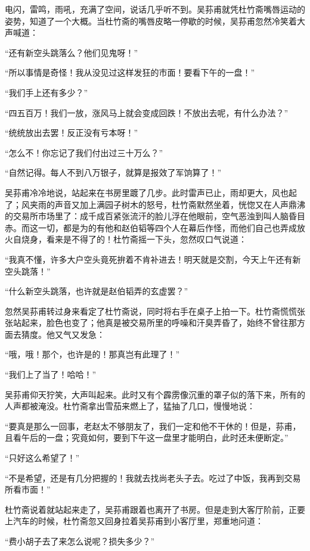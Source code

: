 \par 电闪，雷鸣，雨吼，充满了空间，说话几乎听不到。吴荪甫就凭杜竹斋嘴唇运动的姿势，知道了一个大概。当杜竹斋的嘴唇皮略一停歇的时候，吴荪甫忽然冷笑着大声喊道：
\par “还有新空头跳落么？他们见鬼呀！”
\par “所以事情是奇怪！我从没见过这样发狂的市面！要看下午的一盘！”
\par “我们手上还有多少？”
\par “四五百万！我们一放，涨风马上就会变成回跌！不放出去呢，有什么办法？”
\par “统统放出去罢！反正没有亏本呀！”
\par “怎么不！你忘记了我们付出过三十万么？”
\par “自然记得。每人不到八万银子，就算是报效了军饷算了！”
\par 吴荪甫冷冷地说，站起来在书房里踱了几步。此时雷声已止，雨却更大，风也起了；风夹雨的声音又加上满园子树木的怒号，杜竹斋默然坐着，恍惚又在人声鼎沸的交易所市场里了：成千成百紧张流汗的脸儿浮在他眼前，空气恶浊到叫人脑昏目赤。而这一切，都是为的有他和赵伯韬等四个人在幕后作怪，而他们自己也弄成放火自烧身，看来是不得了的！杜竹斋摇一下头，忽然叹口气说道：
\par “我真不懂，许多大户空头竟死拚着不肯补进去！明天就是交割，今天上午还有新空头跳落！”
\par “什么新空头跳落，也许就是赵伯韬弄的玄虚罢？”
\par 忽然吴荪甫转过身来看定了杜竹斋说，同时将右手在桌子上拍一下。杜竹斋慌慌张张站起来，脸色也变了；他真是被交易所里的呼噪和汗臭弄昏了，始终不曾往那方面去猜度。他又气又发急：
\par “哦，哦！那个，也许是的！那真岂有此理了！”
\par “我们上了当了！哈哈！”
\par 吴荪甫仰天狞笑，大声叫起来。此时又有个霹雳像沉重的罩子似的落下来，所有的人声都被淹没。杜竹斋拿出雪茄来燃上了，猛抽了几口，慢慢地说：
\par “要真是那么一回事，老赵太不够朋友了，我们一定和他不干休的！但是，荪甫，且看午后的一盘；究竟如何，要到下午这一盘里才能明白，此时还未便断定。”
\par “只好这么希望了！”
\par “不是希望，还是有几分把握的！我就去找尚老头子去。吃过了中饭，我再到交易所看市面！”
\par 杜竹斋说着就站起来走了，吴荪甫跟着也离开了书房。但是走到大客厅阶前，正要上汽车的时候，杜竹斋忽又回身拉着吴荪甫到小客厅里，郑重地问道：
\par “费小胡子去了来怎么说呢？损失多少？”
